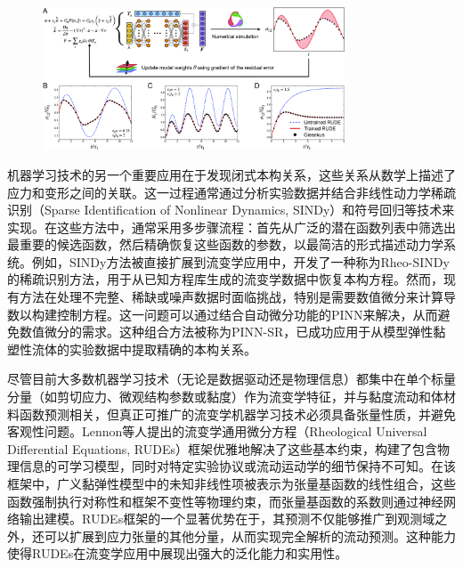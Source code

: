 \begin{figure}[htbp]
  \centering
  \includegraphics[width=0.8\textwidth]{Fig/pnas.2304669120fig01.jpg}
\end{figure}
机器学习技术的另一个重要应用在于发现闭式本构关系，这些关系从数学上描述了应力和变形之间的关联。这一过程通常通过分析实验数据并结合非线性动力学稀疏识别（Sparse Identification of Nonlinear Dynamics, SINDy）和符号回归等技术来实现\cite{Sato2025}。在这些方法中，通常采用多步骤流程：首先从广泛的潜在函数列表中筛选出最重要的候选函数，然后精确恢复这些函数的参数，以最简洁的形式描述动力学系统。例如，SINDy方法被直接扩展到流变学应用中，开发了一种称为Rheo-SINDy的稀疏识别方法，用于从已知方程库生成的流变学数据中恢复本构方程。然而，现有方法在处理不完整、稀缺或噪声数据时面临挑战，特别是需要数值微分来计算导数以构建控制方程\cite{mahmoudabadbozchelouUnbiasedConstructionConstitutive2024}。这一问题可以通过结合自动微分功能的PINN来解决，从而避免数值微分的需求。这种组合方法被称为PINN-SR，已成功应用于从模型弹性黏塑性流体的实验数据中提取精确的本构关系。

尽管目前大多数机器学习技术（无论是数据驱动还是物理信息）都集中在单个标量分量（如剪切应力、微观结构参数或黏度）作为流变学特征，并与黏度流动和体材料函数预测相关，但真正可推广的流变学机器学习技术必须具备张量性质，并避免客观性问题。Lennon等人提出的流变学通用微分方程（Rheological Universal Differential Equations, RUDEs）框架优雅地解决了这些基本约束，构建了包含物理信息的可学习模型，同时对特定实验协议或流动运动学的细节保持不可知\cite{lennonScientificMachineLearning2023a}。在该框架中，广义黏弹性模型中的未知非线性项被表示为张量基函数的线性组合，这些函数强制执行对称性和框架不变性等物理约束，而张量基函数的系数则通过神经网络输出建模。RUDEs框架的一个显著优势在于，其预测不仅能够推广到观测域之外，还可以扩展到应力张量的其他分量，从而实现完全解析的流动预测。这种能力使得RUDEs在流变学应用中展现出强大的泛化能力和实用性。
